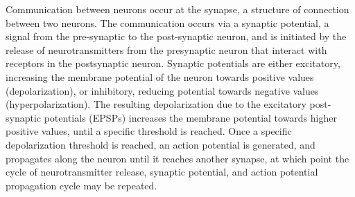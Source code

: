 \documentclass[11pt]{article}
\begin{document}
Communication between neurons occur at the synapse, a structure of connection between two neurons. The communication occurs via a synaptic potential, a signal from the pre-synaptic to the post-synaptic neuron, and is initiated by the release of neurotransmitters from the presynaptic neuron that interact with receptors in the postsynaptic neuron. Synaptic potentials are either excitatory, increasing the membrane potential of the neuron towards positive values (depolarization), or inhibitory, reducing potential towards negative values (hyperpolarization). The resulting depolarization due to the excitatory post-synaptic potentials (EPSPs) increases the membrane potential towards higher positive values, until a specific threshold is reached. Once a specific depolarization threshold is reached, an action potential is generated, and propagates along the neuron until it reaches another synapse, at which point the cycle of neurotransmitter release, synaptic potential, and action potential propagation cycle may be repeated.\par

\end{document}
